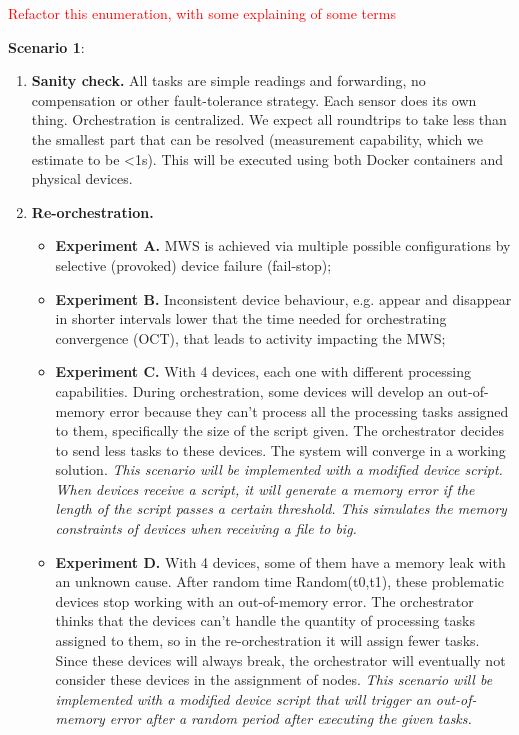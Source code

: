 \textcolor{red}{Refactor this enumeration, with some explaining of some terms}

\textbf{Scenario 1}:
\begin{enumerate}
    \item \textbf{Sanity check.} All tasks are simple readings and forwarding, no compensation or other fault-tolerance strategy. Each sensor does its own thing. Orchestration is centralized. We expect all roundtrips to take less than the smallest part that can be resolved (measurement capability, which we estimate to be <1s). This will be executed using both Docker containers and physical devices.
    \item \textbf{Re-orchestration.}
        \begin{itemize}
            \item \textbf{Experiment A.} MWS is achieved via multiple possible configurations by selective (provoked) device failure (fail-stop);
            \item \textbf{Experiment B.} Inconsistent device behaviour, e.g. appear and disappear in shorter intervals lower that the time needed for orchestrating convergence (OCT), that leads to activity impacting the MWS;
            \item \textbf{Experiment C.} With 4 devices, each one with different processing capabilities. During orchestration, some devices will develop an out-of-memory error because they can't process all the processing tasks assigned to them, specifically the size of the script given. The orchestrator decides to send less tasks to these devices. The system will converge in a working solution. \textit{This scenario will be implemented with a modified device script. When devices receive a script, it will generate a memory error if the length of the script passes a certain threshold. This simulates the memory constraints of devices when receiving a file to big.}
            \item \textbf{Experiment D.} With 4 devices, some of them have a memory leak with an unknown cause. After random time Random(t0,t1), these problematic devices stop working with an out-of-memory error. The orchestrator thinks that the devices can't handle the quantity of processing tasks assigned to them, so in the re-orchestration it will assign fewer tasks. Since these devices will always break, the orchestrator will eventually not consider these devices in the assignment of nodes. \textit{This scenario will be implemented with a modified device script that will trigger an out-of-memory error after a random period after executing the given tasks.}

\end{itemize}
\end{enumerate}
